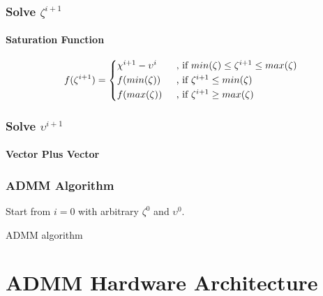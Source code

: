 \documentclass{beamer}
\begin{document}
\begin{frame}
\frametitle{Solve $\zeta^{i+1}$}
\framesubtitle{Saturation Function}

\[ f(\zeta ^{i+1}) =
  \begin{cases*}
   \chi^{i+1}-\upsilon^i \quad& , if $ min(\zeta) \leq \zeta^{i+1} \leq max(\zeta)$\\
   f(min(\zeta)) & , if $\zeta^{i+1} \leq min(\zeta) $ \\
   f(max(\zeta)) & , if $\zeta^{i+1} \geq max(\zeta) $ \\
  \end{cases*}\]
\end{frame}

\begin{frame}
\frametitle{Solve $\upsilon^{i+1}$}
\framesubtitle{Vector Plus Vector}

\end{frame}

\begin{frame}[fragile]
\frametitle{ADMM Algorithm}
\begin{algorithm}[H]
Start from $i=0$ with arbitrary $\zeta^0$ and $\upsilon^0$.
\caption{ADMM algorithm}\label{alg:ADMM}
\end{algorithm}
\end{frame}



\section{ADMM Hardware Architecture}
\end{document}
